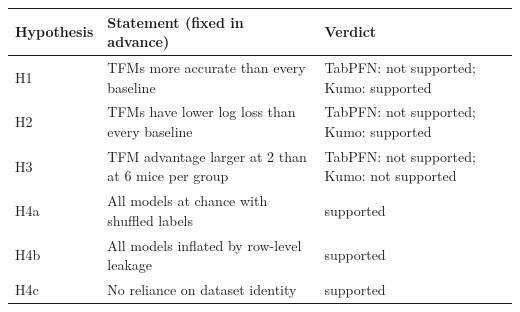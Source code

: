 \begin{tabularx}{\linewidth}{lXl}
\toprule
Hypothesis & Statement (fixed in advance) & Verdict \\
\midrule
H1 & TFMs more accurate than every baseline & TabPFN: not supported; Kumo: supported \\
H2 & TFMs have lower log loss than every baseline & TabPFN: not supported; Kumo: supported \\
H3 & TFM advantage larger at 2 than at 6 mice per group & TabPFN: not supported; Kumo: not supported \\
H4a & All models at chance with shuffled labels & supported \\
H4b & All models inflated by row-level leakage & supported \\
H4c & No reliance on dataset identity & supported \\
\bottomrule
\end{tabularx}
